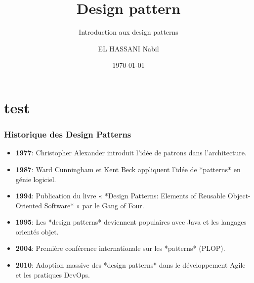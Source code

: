 \documentclass[aspectratio=169]{beamer}
\author{EL HASSANI Nabil}
\title{Design pattern}
\subtitle{Introduction aux design patterns}
\institute{
    Efrei \\
    Université Paris Panthéon-Assas
    }
\date{\small \today}
\begin{document}
\begin{frame}
    \titlepage
\end{frame}

\begin{frame}
    \tableofcontents[hideallsubsections]
\end{frame}
\section{test}
\begin{frame}[t]
    \frametitle{Historique des Design Patterns}
    
    
    \begin{itemize}
        \item<1> \textbf{1977}: Christopher Alexander introduit l'idée de patrons dans l'architecture.
        \item<2> \textbf{1987}: Ward Cunningham et Kent Beck appliquent l'idée de *patterns* en génie logiciel.
        \item<3> \textbf{1994}: Publication du livre « *Design Patterns: Elements of Reusable Object-Oriented Software* » par le Gang of Four.
        \item<4> \textbf{1995}: Les *design patterns* deviennent populaires avec Java et les langages orientés objet.
        \item<5> \textbf{2004}: Première conférence internationale sur les *patterns* (PLOP).
        \item<6> \textbf{2010}: Adoption massive des *design patterns* dans le développement Agile et les pratiques DevOps.
    \end{itemize}
    
    \end{frame}
    
\end{document}
